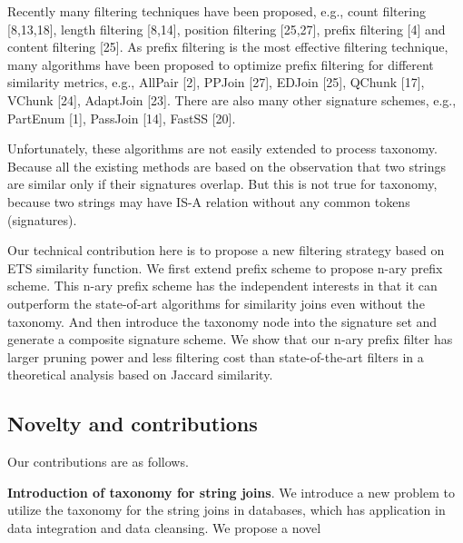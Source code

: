 Recently many filtering techniques have been proposed, e.g., count filtering [8,13,18], length filtering [8,14], position
filtering [25,27], prefix filtering [4] and content filtering [25]. As prefix filtering is the most effective filtering technique,
many algorithms have been proposed to optimize prefix filtering for different similarity metrics, e.g., AllPair [2],
PPJoin [27], EDJoin [25], QChunk [17], VChunk [24], AdaptJoin [23]. There are also many other signature schemes, e.g., PartEnum [1],
PassJoin [14], FastSS [20].

Unfortunately, these algorithms are not easily extended to process taxonomy. Because all the existing methods are based on the observation that two strings are similar only if their signatures overlap. But this is not true for taxonomy, because two strings may have IS-A relation without any common tokens (signatures).

Our technical contribution here is to propose a new filtering strategy based on ETS similarity function. We first extend prefix scheme to propose n-ary prefix scheme. This n-ary prefix scheme has the independent interests in that it can outperform the state-of-art algorithms  for similarity joins even without the taxonomy. And then introduce the taxonomy node into the signature set and generate a composite signature scheme. We show that our n-ary prefix
filter has larger pruning power and less filtering cost
than state-of-the-art filters in a theoretical analysis based on Jaccard similarity.





\subsection{Novelty and contributions}


\smallskip


Our contributions are as follows.

\noindent \textbf{Introduction of taxonomy for string joins}. We introduce a new problem to utilize the taxonomy for the string joins in databases, which has application in data integration and data cleansing. We propose a novel

